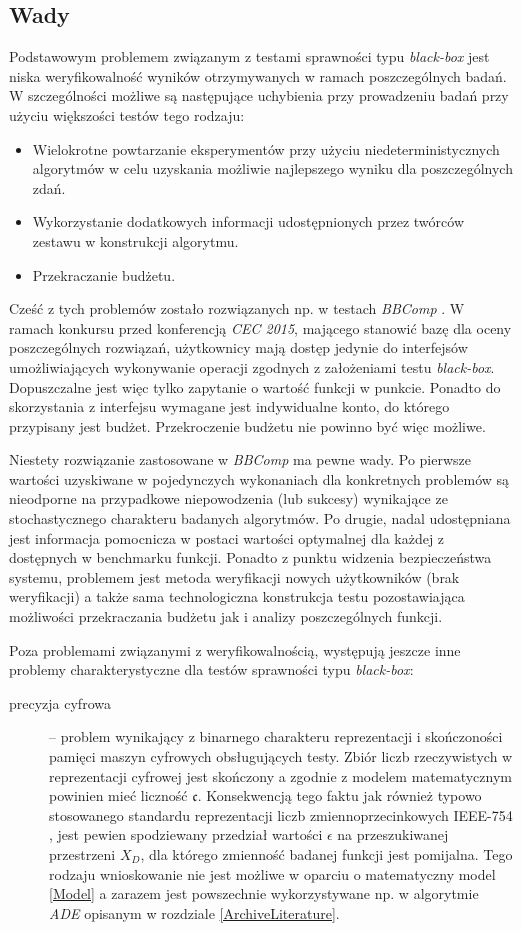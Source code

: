 \documentclass[12pt,a4paper]{report}
\begin{document}
{{{{{{\subsection{Wady}
\label{WadyBB}
\par{
Podstawowym problemem związanym z testami sprawności typu \emph{black-box} jest niska weryfikowalność wyników otrzymywanych w ramach poszczególnych badań. W szczególności możliwe są następujące uchybienia przy prowadzeniu badań przy użyciu większości testów tego rodzaju:
\begin{itemize}
\item Wielokrotne powtarzanie eksperymentów przy użyciu niedeterministycznych algorytmów w celu uzyskania możliwie najlepszego wyniku dla poszczególnych zdań.
\item Wykorzystanie dodatkowych informacji udostępnionych przez twórców zestawu w konstrukcji algorytmu.
\item Przekraczanie budżetu.
\end{itemize}
Cześć z tych problemów zostało rozwiązanych np. w testach \emph{BBComp} \cite{BBComp}. W ramach konkursu przed konferencją \emph{CEC 2015}, mającego stanowić bazę dla oceny poszczególnych rozwiązań, użytkownicy mają dostęp jedynie do interfejsów umożliwiających wykonywanie operacji zgodnych z założeniami testu \emph{black-box}. Dopuszczalne jest więc tylko zapytanie o wartość funkcji w punkcie. Ponadto do skorzystania z interfejsu wymagane jest indywidualne konto, do którego przypisany jest budżet. Przekroczenie budżetu nie powinno być więc możliwe.
}
\par{
Niestety rozwiązanie zastosowane w \emph{BBComp} ma pewne wady. Po pierwsze wartości uzyskiwane w pojedynczych wykonaniach dla konkretnych problemów są nieodporne na przypadkowe niepowodzenia (lub sukcesy) wynikające ze stochastycznego charakteru badanych algorytmów.
Po drugie, nadal udostępniana jest informacja pomocnicza w postaci wartości optymalnej dla każdej z dostępnych w benchmarku funkcji. Ponadto z punktu widzenia bezpieczeństwa systemu, problemem jest metoda weryfikacji nowych użytkowników (brak weryfikacji) a także sama technologiczna konstrukcja testu pozostawiająca możliwości przekraczania budżetu jak i analizy poszczególnych funkcji.
}
\par{
Poza problemami związanymi z weryfikowalnością, występują jeszcze inne problemy charakterystyczne dla testów sprawności typu \emph{black-box}:
\begin{description}
\item[precyzja cyfrowa] -- problem wynikający z binarnego charakteru reprezentacji i skończoności pamięci maszyn cyfrowych obsługujących testy. Zbiór liczb rzeczywistych w reprezentacji cyfrowej jest skończony a zgodnie z modelem matematycznym powinien mieć liczność $\mathfrak{c}$. Konsekwencją tego faktu jak również typowo stosowanego standardu reprezentacji liczb zmiennoprzecinkowych IEEE-754 \cite{IEEE754}, jest pewien spodziewany przedział wartości $\epsilon$ na przeszukiwanej przestrzeni $X_D$, dla którego zmienność badanej funkcji jest pomijalna. Tego rodzaju wnioskowanie nie jest możliwe w oparciu o matematyczny model \ref{Model} a zarazem jest powszechnie wykorzystywane np. w algorytmie \emph{ADE} opisanym w rozdziale \ref{ArchiveLiterature}.

\end{description}}}}}}}}
\end{document}
